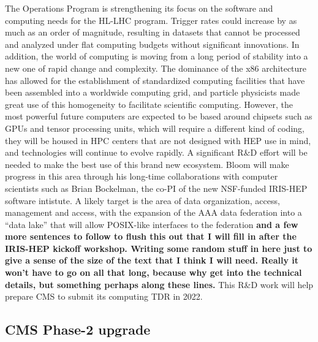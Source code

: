 The Operations Program is strengthening its focus on the software and computing needs for the HL-LHC program.  Trigger rates could increase by as much as an order of magnitude, resulting in datasets that cannot be processed and analyzed under flat computing budgets without significant innovations.  In addition, the world of computing is moving from a long period of stability into a new one of rapid change and complexity.  The dominance of the x86 architecture has allowed for the establishment of standardized computing facilities that have been assembled into a worldwide computing grid, and particle physicists made great use of this homogeneity to facilitate scientific computing.  However, the most powerful future computers are expected to be based around chipsets such as GPUs and tensor processing units, which will require a different kind of coding, they will be housed in HPC centers that are not designed with HEP use in mind, and technologies will continue to evolve rapidly.  A significant R\&D effort will be needed to make the best use of this brand new ecosystem.  Bloom will make progress in this area through his long-time collaborations with computer scientists such as Brian Bockelman, the co-PI of the new NSF-funded IRIS-HEP software intistute.  A likely target is the area of data organization, access, management and access, with the expansion of the AAA data federation into a ``data lake'' that will allow POSIX-like interfaces to the federation {\bf and a few more sentences to follow to flush this out that I will fill in after the IRIS-HEP kickoff workshop.  Writing some random stuff in here just to give a sense of the size of the text that I think I will need.  Really it won't have to go on all that long, because why get into the technical details, but something perhaps along these lines.}  This R\&D work will help prepare CMS to submit its computing TDR in 2022.

\subsection{CMS Phase-2 upgrade}



